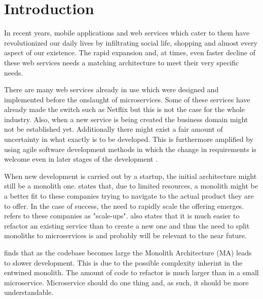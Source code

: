 
\section{Introduction}
\begin{sloppypar}
    In recent years, mobile applications and web services which cater to them 
    have revolutionized our daily lives by infiltrating social life, shopping 
    and almost every aspect of our existence. The rapid expansion and, at times, 
    even faster decline of these web services needs a matching architecture to 
    meet their very specific needs.  
\end{sloppypar}
\begin{sloppypar}
    There are many web services already in use which were designed and 
    implemented before the onslaught of microservices. Some of these services 
    have already made the switch such as Netflix but this is not the case for 
    the whole industry. Also, when a new service is being created the business 
    domain might not be established yet. Additionally there might exist a fair 
    amount of uncertainty in what exactly is to be developed. This is 
    furthermore amplified by using agile software development methods in which
    the change in requirements is welcome even in later stages of the 
    development \citep{agilemanifesto}.
\end{sloppypar}
\begin{sloppypar}
    When new development is carried out by a startup, the initial architecture 
    might still be a monolith one. \citet{newman2019} states that, due to limited 
    resources, a monolith might be a better fit to these companies trying to 
    navigate to the actual product they are to offer. In the case of success, 
    the need to rapidly scale the offering emerges. \citet{newman2019} refers 
    to these companies as "scale-ups". \citet{newman2019} also states that it 
    is much easier to refactor an existing service than to create a new one and
    thus the need to split monoliths to microservices is and probably will be 
    relevant to the near future.
\end{sloppypar}
\begin{sloppypar}
    \citet{10.1007/978-3-319-74433-9_3} finds that as the codebase becomes large 
    the Monolith Architecture (MA) leads to slower development. This is due to 
    the possible complexity inherint in the entwined monolith. The amount of 
    code to refactor is much larger than in a small microservice. Microservice 
    should do one thing and, as such, it should be more understandable.
\end{sloppypar} 
